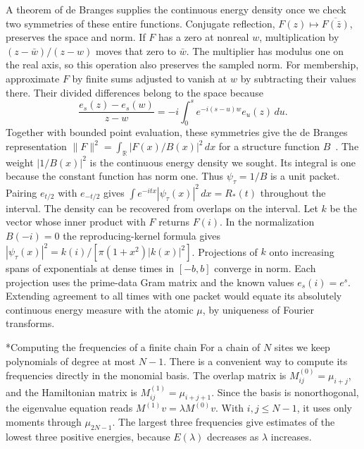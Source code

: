 \documentclass[11pt,letterpaper]{article}
\makeatletter
\renewcommand\subsection{\@startsection{subsection}{2}{\z@}{-2.0ex plus -.3ex}{.75ex}{\normalfont\normalsize\itshape}}
\numberwithin{equation}{section}
\makeatother
\begin{document}
A theorem of de Branges supplies the continuous energy density once we check two symmetries of these entire functions. Conjugate reflection, $F(z)\mapsto\overline{F(\bar z)}$, preserves the space and norm. If $F$ has a zero at nonreal $w$, multiplication by $(z-\bar w)/(z-w)$ moves that zero to $\bar w$. The multiplier has modulus one on the real axis, so this operation also preserves the sampled norm. For membership, approximate $F$ by finite sums adjusted to vanish at $w$ by subtracting their values there. Their divided differences belong to the space because
\[
 \frac{e_s(z)-e_s(w)}{z-w}=-i\int_0^s e^{-i(s-u)w}e_u(z)\,du .
\]
Together with bounded point evaluation, these symmetries give the de Branges representation $\|F\|^2=\int_{\mathbb R}|F(x)/B(x)|^2\,dx$ for a structure function $B$~\cite[Theorem~23]{debrangesbook}. The weight $|1/B(x)|^2$ is the continuous energy density we sought. Its integral is one because the constant function has norm one. Thus $\psi_\tau=1/B$ is a unit packet. Pairing $e_{t/2}$ with $e_{-t/2}$ gives $\int e^{-itx}|\psi_\tau(x)|^2\,dx=R_*(t)$ throughout the interval. The density can be recovered from overlaps on the interval. Let $k$ be the vector whose inner product with $F$ returns $F(i)$. In the normalization $B(-i)=0$ the reproducing-kernel formula gives $|\psi_\tau(x)|^2=k(i)/[\pi(1+x^2)|k(x)|^2]$. Projections of $k$ onto increasing spans of exponentials at dense times in $[-b,b]$ converge in norm. Each projection uses the prime-data Gram matrix and the known values $e_s(i)=e^s$. Extending agreement to all times with one packet would equate its absolutely continuous energy measure with the atomic $\mu$, by uniqueness of Fourier transforms.

\subsection*{Computing the frequencies of a finite chain}
For a chain of $N$ sites we keep polynomials of degree at most $N-1$. There is a convenient way to compute its frequencies directly in the monomial basis. The overlap matrix is $M^{(0)}_{ij}=\mu_{i+j}$, and the Hamiltonian matrix is $M^{(1)}_{ij}=\mu_{i+j+1}$. Since the basis is nonorthogonal, the eigenvalue equation reads $M^{(1)}v=\lambda M^{(0)}v$. With $i,j\le N-1$, it uses only moments through $\mu_{2N-1}$. The largest three frequencies give estimates of the lowest three positive energies, because $E(\lambda)$ decreases as $\lambda$ increases.
\end{document}

